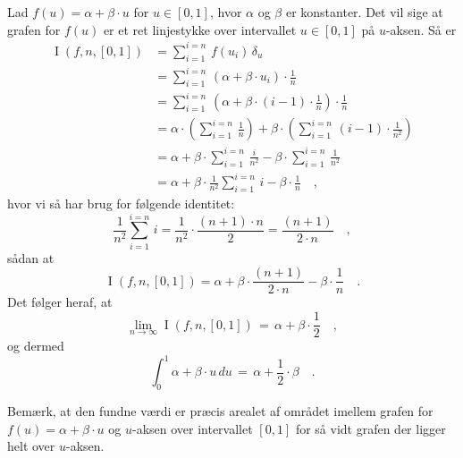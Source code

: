 \begin{example}[Førstegradspolynomium]\label{exampLin}
Lad $f(u) = \alpha + \beta\cdot u$ for $u\in [0,1]$, hvor $\alpha$ og $\beta$ er konstanter. Det vil sige at grafen for $f(u)$ er et ret linjestykke over intervallet  $u\in [0,1]$ på $u$-aksen. Så er
\begin{equation}
\begin{aligned}
\operatorname{I}(f,n, [0, 1]) &= \sum_{i=1}^{i=n}\, f\left(u_{i}\right)\,\delta_{u} \\
&= \sum_{i=1}^{i=n}\, \left(\alpha + \beta\cdot u_{i}\right) \cdot \frac{1}{n} \\
&= \sum_{i=1}^{i=n}\, \left(\alpha + \beta\cdot (i-1)\cdot \frac{1}{n}\right) \cdot \frac{1}{n} \\
&= \alpha \cdot \left(\sum_{i=1}^{i=n}\, \frac{1}{n}\right) + \beta\cdot \left(\sum_{i=1}^{i=n}\,(i-1)\cdot \frac{1}{n^{2}}\right)\\
&= \alpha + \beta\cdot \sum_{i=1}^{i=n}\,\frac{i}{n^{2}} - \beta\cdot \sum_{i=1}^{i=n}\,\frac{1}{n^{2}}\\
&= \alpha + \beta \cdot \frac{1}{n^{2}}\sum_{i=1}^{i=n}\,i - \beta\cdot \frac{1}{n} \quad ,
\end{aligned}
\end{equation}
hvor vi så har brug for følgende identitet:
\begin{equation}
\frac{1}{n^{2}}\sum_{i=1}^{i=n}\,i = \frac{1}{n^{2}}\cdot \frac{(n+1)\cdot n}{2} =  \frac{(n+1)}{2\cdot n} \quad ,
\end{equation}
sådan at
\begin{equation}
\operatorname{I}(f,n, [0, 1]) = \alpha + \beta \cdot \frac{(n+1)}{2\cdot n} - \beta\cdot \frac{1}{n} \quad .
\end{equation}
Det følger heraf, at
\begin{equation}
\lim_{n \to \infty} \operatorname{I}(f,n, [0, 1]) \, = \, \alpha + \beta \cdot \frac{1}{2} \quad , 
\end{equation}
og dermed 
\begin{equation}
\int_{0}^{1} \alpha + \beta \cdot u   \, du \, = \, \alpha +  \frac{1}{2} \cdot \beta \quad .
\end{equation}


Bemærk, at den fundne værdi er præcis arealet af området imellem grafen for $f(u) = \alpha + \beta\cdot u$ og $u$-aksen over intervallet $[0, 1]$ for så vidt grafen der ligger helt over $u$-aksen.

\end{example}


